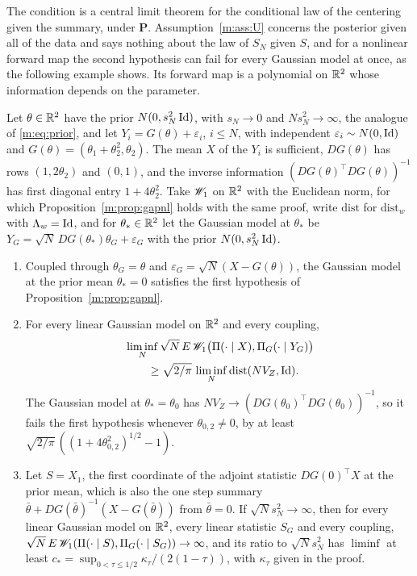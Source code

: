The condition is a central limit theorem for the conditional law of the centering given the summary, under $\mathbf P$. Assumption~\ref{m:ass:U} concerns the posterior given all of the data and says nothing about the law of $S_N$ given $S$, and for a nonlinear forward map the second hypothesis can fail for every Gaussian model at once, as the following example shows. Its forward map is a polynomial on $\mathbb{R}^2$ whose information depends on the parameter.

\begin{proposition}\label{m:prop:gaptoy}
Let $\theta\in\mathbb{R}^2$ have the prior $N(0,s_N^2\operatorname{Id})$, with $s_N\to0$ and $Ns_N^2\to\infty$, the analogue of \eqref{m:eq:prior}, and let $Y_i=G(\theta)+\varepsilon_i$, $i\le N$, with independent $\varepsilon_i\sim N(0,\operatorname{Id})$ and $G(\theta)=(\theta_1+\theta_2^2,\theta_2)$. The mean $X$ of the $Y_i$ is sufficient, $DG(\theta)$ has rows $(1,2\theta_2)$ and $(0,1)$, and the inverse information $(DG(\theta)^\top DG(\theta))^{-1}$ has first diagonal entry $1+4\theta_2^2$. Take $\mathscr{W}_1$ on $\mathbb{R}^2$ with the Euclidean norm, for which Proposition~\ref{m:prop:gapnl} holds with the same proof, write $\mathrm{dist}$ for $\mathrm{dist}_w$ with $\Lambda_w=\operatorname{Id}$, and for $\theta_\ast\in\mathbb{R}^2$ let the Gaussian model at $\theta_\ast$ be $Y_G=\sqrt N\,DG(\theta_\ast)\theta_G+\varepsilon_G$ with the prior $N(0,s_N^2\operatorname{Id})$.
\begin{enumerate}[label=(\alph*),nosep]
\item Coupled through $\theta_G=\theta$ and $\varepsilon_G=\sqrt N(X-G(\theta))$, the Gaussian model at the prior mean $\theta_\ast=0$ satisfies the first hypothesis of Proposition~\ref{m:prop:gapnl}.
\item For every linear Gaussian model on $\mathbb{R}^2$ and every coupling,
\[
\begin{aligned}
&\liminf_N\sqrt N\,E\,\mathscr{W}_1\big(\Pi(\cdot\mid X),\Pi_G(\cdot\mid Y_G)\big)\\
&\qquad\ge\sqrt{2/\pi}\,\liminf_N\mathrm{dist}(NV_Z,\operatorname{Id}) .
\end{aligned}
\]
The Gaussian model at $\theta_\ast=\theta_0$ has $NV_Z\to(DG(\theta_0)^\top DG(\theta_0))^{-1}$, so it fails the first hypothesis whenever $\theta_{0,2}\ne0$, by at least $\sqrt{2/\pi}\,((1+4\theta_{0,2}^2)^{1/2}-1)$.
\item Let $S=X_1$, the first coordinate of the adjoint statistic $DG(0)^\top X$ at the prior mean, which is also the one step summary $\bar\theta+DG(\bar\theta)^{-1}(X-G(\bar\theta))$ from $\bar\theta=0$. If $\sqrt Ns_N^2\to\infty$, then for every linear Gaussian model on $\mathbb{R}^2$, every linear statistic $S_G$ and every coupling, $\sqrt N\,E\,\mathscr{W}_1(\Pi(\cdot\mid S),\Pi_G(\cdot\mid S_G))\to\infty$, and its ratio to $\sqrt Ns_N^2$ has $\liminf$ at least $c_\ast=\sup_{0<\tau\le1/2}\kappa_\tau/(2(1-\tau))$, with $\kappa_\tau$ given in the proof.

\end{enumerate}
\end{proposition}
